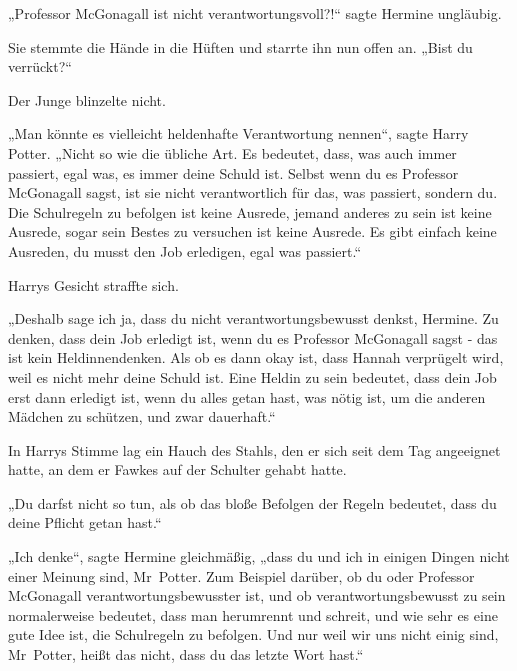 {„Professor McGonagall ist nicht verantwortungsvoll?!“ sagte Hermine ungläubig.

Sie stemmte die Hände in die Hüften und starrte ihn nun offen an. „Bist du verrückt?“

Der Junge blinzelte nicht.

„Man könnte es vielleicht heldenhafte Verantwortung nennen“, sagte Harry Potter. „Nicht so wie die übliche Art. Es bedeutet, dass, was auch immer passiert, egal was, es immer deine Schuld ist. Selbst wenn du es Professor McGonagall sagst, ist sie nicht verantwortlich für das, was passiert, sondern du. Die Schulregeln zu befolgen ist keine Ausrede, jemand anderes zu sein ist keine Ausrede, sogar sein Bestes zu versuchen ist keine Ausrede. Es gibt einfach keine Ausreden, du musst den Job erledigen, egal was passiert.“

Harrys Gesicht straffte sich.

„Deshalb sage ich ja, dass du nicht verantwortungsbewusst denkst, Hermine. Zu denken, dass dein Job erledigt ist, wenn du es Professor McGonagall sagst - das ist kein Heldinnendenken. Als ob es dann okay ist, dass Hannah verprügelt wird, weil es nicht mehr deine Schuld ist. Eine Heldin zu sein bedeutet, dass dein Job erst dann erledigt ist, wenn du alles getan hast, was nötig ist, um die anderen Mädchen zu schützen, und zwar dauerhaft.“

In Harrys Stimme lag ein Hauch des Stahls, den er sich seit dem Tag angeeignet hatte, an dem er Fawkes auf der Schulter gehabt hatte.

„Du darfst nicht so tun, als ob das bloße Befolgen der Regeln bedeutet, dass du deine Pflicht getan hast.“

„Ich denke“, sagte Hermine gleichmäßig, „dass du und ich in einigen Dingen nicht einer Meinung sind, Mr~Potter. Zum Beispiel darüber, ob du oder Professor McGonagall verantwortungsbewusster ist, und ob verantwortungsbewusst zu sein normalerweise bedeutet, dass man herumrennt und schreit, und wie sehr es eine gute Idee ist, die Schulregeln zu befolgen. Und nur weil wir uns nicht einig sind, Mr~Potter, heißt das nicht, dass du das letzte Wort hast.“

}
